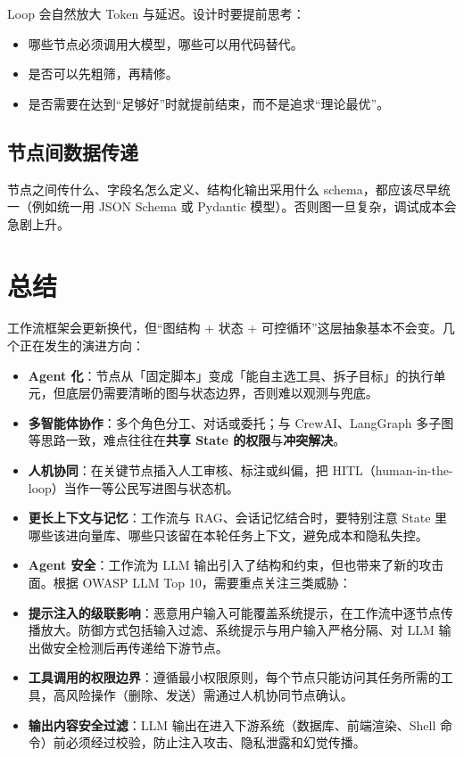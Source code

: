 \documentclass[9pt,a4paper,twocolumn]{ctexart}
\begin{document}
Loop 会自然放大 Token 与延迟。设计时要提前思考：


\begin{itemize}[itemsep=1pt, topsep=2pt]
  \item 哪些节点必须调用大模型，哪些可以用代码替代。
  \item 是否可以先粗筛，再精修。
  \item 是否需要在达到“足够好”时就提前结束，而不是追求“理论最优”。
\end{itemize}


\subsection*{节点间数据传递}


节点之间传什么、字段名怎么定义、结构化输出采用什么 schema，都应该尽早统一（例如统一用 JSON Schema 或 Pydantic 模型）。否则图一旦复杂，调试成本会急剧上升。



\section*{总结}


工作流框架会更新换代，但“图结构 + 状态 + 可控循环”这层抽象基本不会变。几个正在发生的演进方向：


\begin{itemize}[itemsep=1pt, topsep=2pt]
  \item \textbf{Agent 化}：节点从「固定脚本」变成「能自主选工具、拆子目标」的执行单元，但底层仍需要清晰的图与状态边界，否则难以观测与兜底。
  \item \textbf{多智能体协作}：多个角色分工、对话或委托；与 CrewAI、LangGraph 多子图等思路一致，难点往往在\textbf{共享 State 的权限}与\textbf{冲突解决}。
  \item \textbf{人机协同}：在关键节点插入人工审核、标注或纠偏，把 HITL（human-in-the-loop）当作一等公民写进图与状态机。
  \item \textbf{更长上下文与记忆}：工作流与 RAG、会话记忆结合时，要特别注意 State 里哪些该进向量库、哪些只该留在本轮任务上下文，避免成本和隐私失控。
  \item \textbf{Agent 安全}：工作流为 LLM 输出引入了结构和约束，但也带来了新的攻击面。根据 OWASP LLM Top 10，需要重点关注三类威胁：
  \item \textbf{提示注入的级联影响}：恶意用户输入可能覆盖系统提示，在工作流中逐节点传播放大。防御方式包括输入过滤、系统提示与用户输入严格分隔、对 LLM 输出做安全检测后再传递给下游节点。
  \item \textbf{工具调用的权限边界}：遵循最小权限原则，每个节点只能访问其任务所需的工具，高风险操作（删除、发送）需通过人机协同节点确认。
  \item \textbf{输出内容安全过滤}：LLM 输出在进入下游系统（数据库、前端渲染、Shell 命令）前必须经过校验，防止注入攻击、隐私泄露和幻觉传播。
\end{itemize}
\end{document}
